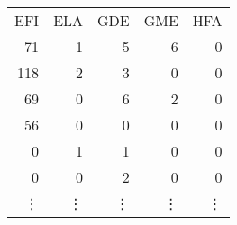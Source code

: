 \begin{tabular}{rrrrr}
EFI & ELA & GDE & GME & HFA \\
 71 &   1 &   5 &   6 &   0 \\
118 &   2 &   3 &   0 &   0 \\
 69 &   0 &   6 &   2 &   0 \\
 56 &   0 &   0 &   0 &   0 \\
  0 &   1 &   1 &   0 &   0 \\
  0 &   0 &   2 &   0 &   0 \\
\vdots & \vdots & \vdots & \vdots & \vdots
\end{tabular}
%
